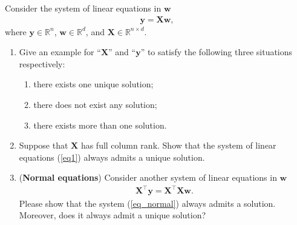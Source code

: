 \documentclass[11pt,letter,notitlepage]{article}
\begin{document}
\begin{exercise}

Consider the system of linear equations in $\mathbf{w}$
\begin{align}\label{eq1}
    \mathbf{y} = \mathbf{X} \mathbf{w} ,    
\end{align}
where $\mathbf{y} \in \mathbb{R}^{n}$, $\mathbf{w} \in \mathbb{R}^{d}$, and $\mathbf{X} \in \mathbb{R}^{n \times d}$.

\begin{enumerate}
    \item 
    
        Give an example for ``$\mathbf{X}$'' and ``$\mathbf{y}$'' to satisfy the following three situations respectively:
    \begin{enumerate}
        \item there exists one unique solution;
        \item there does not exist any solution;
        \item there exists more than one solution.
    \end{enumerate}
   
    \item 
    \iffalse
    Suppose that the equation (\ref{eq1}) admits a solution, prove that $\mathbf{y} \in \mathcal{C}(\mathbf{X})$ where $\mathcal{C}(\mathbf{X}) $ is the column space of $\mathbf{X}$.
    \fi
    Suppose that $\mathbf{X}$ has full column rank. Show that the system of linear equations (\ref{eq1}) always admits a unique solution.
        
    \item (\textbf{Normal equations}) Consider  another system of linear equations in $\mathbf{w}$
    \begin{align}\label{eq_normal}
        \mathbf{X}^{\top}\mathbf{y} = \mathbf{X}^{\top}\mathbf{X}\mathbf{w}. 
    \end{align}
    Please show that the system (\ref{eq_normal}) always admits a solution. Moreover, does it always admit a unique solution?
\end{enumerate}
    
\end{exercise}
\end{document}
